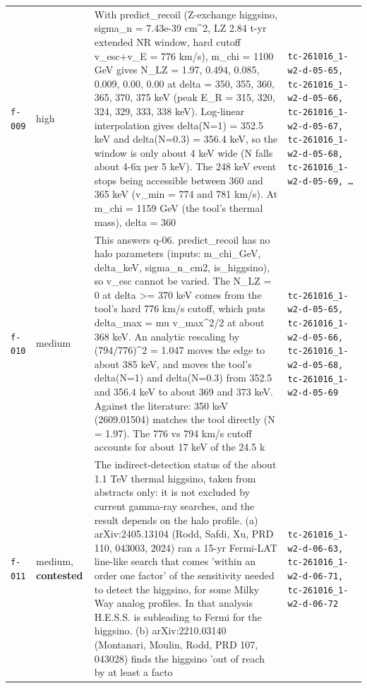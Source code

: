 \documentclass[11pt,a4paper]{article}
\begin{document}
\begin{longtable}{@{}p{}p{}p{}p{}@{}}
\texttt{f-009} & high & With predict\_recoil (Z-exchange higgsino, sigma\_n = 7.43e-39 cm\textasciicircum{}2, LZ 2.84 t-yr extended NR window, hard cutoff v\_esc+v\_E = 776 km/s), m\_chi = 1100 GeV gives N\_LZ = 1.97, 0.494, 0.085, 0.009, 0.00, 0.00 at delta = 350, 355, 360, 365, 370, 375 keV (peak E\_R = 315, 320, 324, 329, 333, 338 keV). Log-linear interpolation gives delta(N=1) = 352.5 keV and delta(N=0.3) = 356.4 keV, so the window is only about 4 keV wide (N falls about 4-6x per 5 keV). The 248 keV event stops being accessible between 360 and 365 keV (v\_min = 774 and 781 km/s). At m\_chi = 1159 GeV (the tool's thermal mass), delta = 360 & \texttt{tc-261016\_\allowbreak{}1-w2-d-05-65,\allowbreak{} tc-261016\_\allowbreak{}1-w2-d-05-66,\allowbreak{} tc-261016\_\allowbreak{}1-w2-d-05-67,\allowbreak{} tc-261016\_\allowbreak{}1-w2-d-05-68,\allowbreak{} tc-261016\_\allowbreak{}1-w2-d-05-69,\allowbreak{} \ldots{}\allowbreak{}} \\
\texttt{f-010} & medium & This answers q-06. predict\_recoil has no halo parameters (inputs: m\_chi\_GeV, delta\_keV, sigma\_n\_cm2, is\_higgsino), so v\_esc cannot be varied. The N\_LZ = 0 at delta \textgreater{}= 370 keV comes from the tool's hard 776 km/s cutoff, which puts delta\_max = mu v\_max\textasciicircum{}2/2 at about 368 keV. An analytic rescaling by (794/776)\textasciicircum{}2 = 1.047 moves the edge to about 385 keV, and moves the tool's delta(N=1) and delta(N=0.3) from 352.5 and 356.4 keV to about 369 and 373 keV. Against the literature: 350 keV (2609.01504) matches the tool directly (N = 1.97). The 776 vs 794 km/s cutoff accounts for about 17 keV of the 24.5 k & \texttt{tc-261016\_\allowbreak{}1-w2-d-05-65,\allowbreak{} tc-261016\_\allowbreak{}1-w2-d-05-66,\allowbreak{} tc-261016\_\allowbreak{}1-w2-d-05-68,\allowbreak{} tc-261016\_\allowbreak{}1-w2-d-05-69} \\
\texttt{f-011} & medium, \textbf{contested} & The indirect-detection status of the about 1.1 TeV thermal higgsino, taken from abstracts only: it is not excluded by current gamma-ray searches, and the result depends on the halo profile. (a) arXiv:2405.13104 (Rodd, Safdi, Xu, PRD 110, 043003, 2024) ran a 15-yr Fermi-LAT line-like search that comes 'within an order one factor' of the sensitivity needed to detect the higgsino, for some Milky Way analog profiles. In that analysis H.E.S.S. is subleading to Fermi for the higgsino. (b) arXiv:2210.03140 (Montanari, Moulin, Rodd, PRD 107, 043028) finds the higgsino 'out of reach by at least a facto & \texttt{tc-261016\_\allowbreak{}1-w2-d-06-63,\allowbreak{} tc-261016\_\allowbreak{}1-w2-d-06-71,\allowbreak{} tc-261016\_\allowbreak{}1-w2-d-06-72} \\

\end{longtable}
\end{document}
